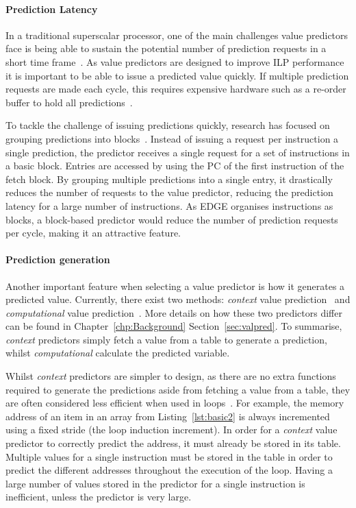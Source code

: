 \paragraph*{Prediction Latency}
In a traditional superscalar processor, one of the main challenges value predictors face is being able to sustain the potential number of prediction requests in a short time frame~\cite{peraisBeBop2015}.
As value predictors are designed to improve ILP performance it is important to be able to issue a predicted value quickly.
If multiple prediction requests are made each cycle, this requires expensive hardware such as a re-order buffer to hold all predictions~\cite{peraisBeBop2015}.

To tackle the challenge of issuing predictions quickly, research has focused on grouping predictions into blocks~\cite{peraisBeBop2015}.
Instead of issuing a request per instruction a single prediction, the predictor receives a single request for a set of instructions in a basic block.
Entries are accessed by using the PC of the first instruction of the fetch block.
By grouping multiple predictions into a single entry, it drastically reduces the number of requests to the value predictor, reducing the prediction latency for a large number of instructions.
As EDGE organises instructions as blocks, a block-based predictor would reduce the number of prediction requests per cycle, making it an attractive feature.

\paragraph*{Prediction generation} Another important feature when selecting a value predictor is how it generates a predicted value.
Currently, there exist two methods: \textit{context} value prediction~\cite{peraisVTAGE2014} and \textit{computational} value prediction~\cite{peraisBeBop2015,gabbayVPOrig,goeman01dfcm}.
More details on how these two predictors differ can be found in Chapter~\ref{chp:Background} Section~\ref{sec:valpred}.
To summarise, \textit{context} predictors simply fetch a value from a table to generate a prediction, whilst \textit{computational} calculate the predicted variable.

Whilst \textit{context} predictors are simpler to design, as there are no extra functions required to generate the predictions aside from fetching a value from a table, they are often considered less efficient when used in loops~\cite{peraisBeBop2015}.
For example, the memory address of an item in an array from Listing~\ref{lst:basic2} is always incremented using a fixed stride (the loop induction increment).
In order for a \textit{context} value predictor to correctly predict the address, it must already be stored in its table.
Multiple values for a single instruction must be stored in the table in order to predict the different addresses throughout the execution of the loop.
Having a large number of values stored in the predictor for a single instruction is inefficient, unless the predictor is very large.

